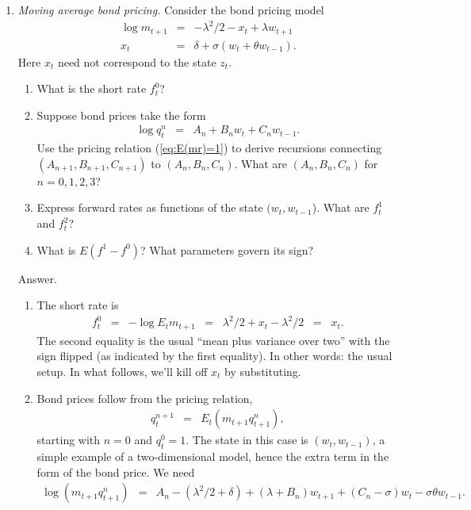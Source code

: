 \documentclass[11pt]{article}
\begin{document}
\begin{enumerate}
\item {\it Moving average bond pricing.\/}
Consider the bond pricing model
\begin{eqnarray*}
    \log m_{t+1} &=& - \lambda^2/2 - x_t + \lambda w_{t+1} \\
    x_t &=& \delta + \sigma (w_t + \theta w_{t-1}) .
\end{eqnarray*}
Here $x_t$ need not correspond to the state $z_t$.

\begin{enumerate}
\item What is the short rate $f^0_t$?
\item Suppose bond prices take the form
\begin{eqnarray*}
    \log q^n_{t} &=& A_n + B_n w_t + C_n w_{t-1} .
\end{eqnarray*}
Use the pricing relation (\ref{eq:E(mr)=1}) to derive recursions connecting
$(A_{n+1}, B_{n+1}, C_{n+1})$ to $(A_{n}, B_{n}, C_{n})$.
What are $(A_{n}, B_{n}, C_{n})$ for $n=0,1,2,3$?
\item Express forward rates as functions of the state $(w_t,w_{t-1}$).
What are $f^1_t$ and $f^2_t$?
\item What is $E(f^1- f^0)$?  What parameters govern its sign?
\end{enumerate}
%
Answer.
\begin{enumerate}
\item The short rate is
\begin{eqnarray*}
    f^0_t &=& - \log E_t m_{t+1} \;\;=\;\;  \lambda^2/2 + x_t - \lambda^2/2
            \;\;=\;\; x_t .
\end{eqnarray*}
The second equality is the usual ``mean plus variance over two'' with the sign flipped
(as indicated by the first equality).
In other words:  the usual setup.
In what follows, we'll kill off $x_t$ by substituting.
\item
Bond prices follow from the pricing relation,
\begin{eqnarray*}
    q_t^{n+1} &=& E_t (m_{t+1} q_{t+1}^n) ,
\end{eqnarray*}
starting with $n=0$ and  $q^0_t = 1$.
The state in this case is $(w_t, w_{t-1})$, a simple example of a
two-dimensional model, hence the extra term in the form of the bond price.
We need
\begin{eqnarray*}
    \log (m_{t+1} q_{t+1}^n) &=&
            A_n - (\lambda^2/2 + \delta) + (\lambda+B_n) w_{t+1}
            + (C_n-\sigma) w_t - \sigma \theta w_{t-1} .

\end{eqnarray*}
\end{enumerate}
\end{enumerate}
\end{document}
